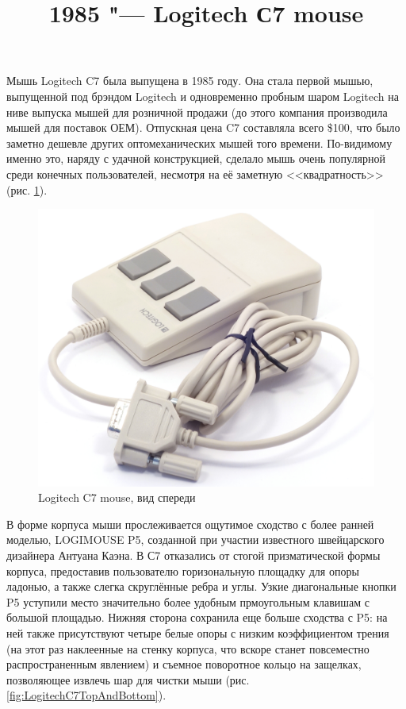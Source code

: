 \documentclass[11pt, a4paper]{article}
\begin{document}
\title{1985 "--- Logitech С7 mouse}
\date{}
\maketitle
{}
Мышь Logitech C7 была выпущена в 1985 году. Она стала первой мышью, выпущенной под брэндом Logitech \cite{timeline} и одновременно пробным шаром Logitech на ниве выпуска мышей для розничной продажи (до этого компания производила мышей для поставок ОЕМ). Отпускная цена C7 составляла всего \$100, что было заметно дешевле других оптомеханических мышей того времени. По-видимому именно это, наряду с удачной конструкцией, сделало мышь очень популярной среди конечных пользователей, несмотря на её заметную <<квадратность>> (рис. \ref{fig:LogitechC7Pic}).

\begin{figure}[h]
   \centering
    \includegraphics[scale=0.45]{1985_logitech_c7_mouse/pic_60.jpg}
    \caption{Logitech C7 mouse, вид спереди}
    \label{fig:LogitechC7Pic}
\end{figure}

В форме корпуса мыши прослеживается ощутимое сходство с более ранней моделью, LOGIMOUSE P5, созданной при участии известного швейцарского дизайнера Антуана Каэна. В С7 отказались от стогой призматической формы корпуса, предоставив пользователю горизональную площадку для опоры ладонью, а также слегка скруглённые ребра и углы. Узкие диагональные кнопки P5 уступили место значительно более удобным прмоугольным клавишам с большой площадью. Нижняя сторона сохранила еще больше сходства с P5: на ней также присутствуют четыре белые опоры с низким коэффициентом трения (на этот раз наклеенные на стенку корпуса, что вскоре станет повсеместно распространенным явлением) и съемное поворотное кольцо на защелках, позволяющее извлечь шар для чистки мыши (рис. \ref{fig:LogitechC7TopAndBottom}).
\end{document}
